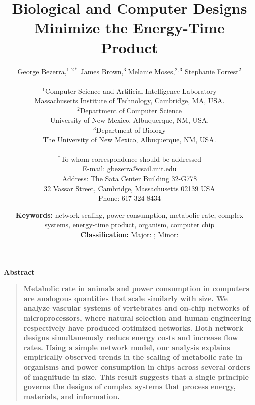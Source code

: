 \documentclass[12pt]{article}
\title{Biological and Computer Designs Minimize the Energy-Time 
Product}
\author
{George Bezerra,$^{1,2\ast}$  James Brown,$^{3}$ Melanie 
Moses,$^{2,3}$ Stephanie Forrest$^{2}$\\
\\
\normalsize{$^{1}$Computer Science and Artificial Intelligence 
Laboratory}\\
\normalsize{Massachusetts Institute of Technology, Cambridge, MA, 
USA.}\\
\normalsize{$^{2}$Department of Computer Science}\\
\normalsize{University of New Mexico, Albuquerque, NM, USA.}\\
\normalsize{$^{3}$Department of Biology}\\
\normalsize{The University of New Mexico, Albuquerque, NM, USA.}\\
\\
\normalsize{$^\ast$To whom correspondence should be addressed}\\
\normalsize{E-mail: gbezerra@csail.mit.edu}\\
\normalsize{Address: The Sata Center Building 32-G778}\\
\normalsize{32 Vassar Street, Cambridge, Massachusetts 02139 USA}\\
\normalsize{Phone: 617-324-8434}\\
}
\date{\normalsize{{\bf Keywords:} network scaling, power consumption, 
metabolic rate, complex systems, energy-time product, organism, 
computer chip}\\
\normalsize{{\bf Classification:} Major: ; Minor: }}
\newenvironment{sciabstract}{%
\begin{quote} \bf}
{\end{quote}}
\begin{document}
 


\baselineskip24pt


\maketitle 


\newpage


\centerline{\Large{\bf Abstract}}
\begin{sciabstract}
  Metabolic rate in animals and power consumption in computers are
  analogous quantities that scale similarly with size.  We analyze
  vascular systems of vertebrates and on-chip networks of
  microprocessors, where natural selection and human engineering
  respectively have produced optimized networks.  
Both network designs
  simultaneously reduce energy costs and increase flow rates.  Using a
  simple network model, our analysis explains empirically observed
  trends in the scaling of metabolic rate in organisms and power
  consumption in chips across several orders of magnitude in size.
  This result suggests that a single principle governs the designs of
  complex systems that process energy, materials, and
  information.
\end{sciabstract}

\newpage
\end{document}
